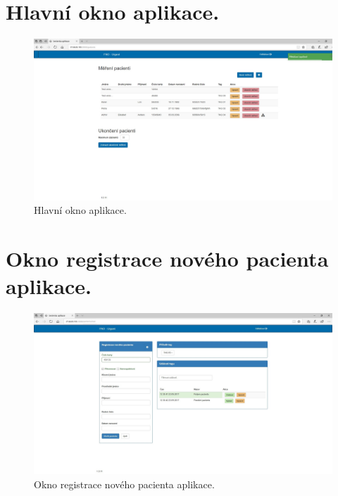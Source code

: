 \documentclass[czech,master,public,dept450,male,oneside, hidelinks]{diploma}
\begin{document}
	\section{Hlavní okno aplikace.}
	\begin{figure}[H]
		\centering
		\includegraphics[width=16cm]{Appendix/src/PatientsScreen.jpg}
		\caption{Hlavní okno aplikace.}
	\end{figure}

	\section{Okno registrace nového pacienta aplikace.}
	\begin{figure}[H]
		\centering
		\includegraphics[width=16cm]{Appendix/src/NewPatientScreen.jpg}
		\caption{Okno registrace nového pacienta aplikace.}
	\end{figure}
	
\end{document}
